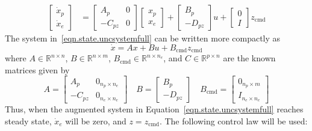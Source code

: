 \begin{equation}
  \label{eqn.state.uncsystemfull}
  \begin{split}
    \begin{bmatrix}
      \dot{x}_{p} \\
      \dot{x}_{e}
    \end{bmatrix}
    &=
    \begin{bmatrix}
      A_{p} & 0 \\
      -C_{pz} & 0
    \end{bmatrix}
    \begin{bmatrix}
      x_{p} \\
      x_{e}
    \end{bmatrix}
    +
    \begin{bmatrix}
      B_{p} \\
      -D_{pz}
    \end{bmatrix} u
    +
    \begin{bmatrix}
      0 \\
      I
    \end{bmatrix}z_{\text{cmd}}
  \end{split}
\end{equation}
The system in~\eqref{eqn.state.uncsystemfull} can be written more compactly as
\begin{equation}
  \label{eqn.state.uncsystem}
  \dot{x}=Ax+Bu+B_{\text{cmd}}z_{\text{cmd}}
\end{equation}
where $A\in\mathbb{R}^{n\times n}$, $B\in\mathbb{R}^{n\times m}$, $B_{\text{cmd}}\in\mathbb{R}^{n\times n_{e}}$, and $C\in\mathbb{R}^{p\times n}$ are the known matrices given by
\begin{equation*}
  A=
  \begin{bmatrix}
    A_{p} & 0_{n_{p}\times n_{e}} \\
    -C_{pz} & 0_{n_{e}\times n_{e}}
  \end{bmatrix} \quad
  B=
  \begin{bmatrix}
    B_{p} \\
    -D_{pz}
  \end{bmatrix}
  \quad
  B_{\text{cmd}}=
  \begin{bmatrix}
    0_{n_{p}\times m} \\
    I_{n_{e}\times n_{e}}
  \end{bmatrix}
\end{equation*}
Thus, when the augmented system in Equation~\eqref{eqn.state.uncsystemfull} reaches steady state, $\dot{x}_{e}$ will be zero, and $z=z_{\text{cmd}}$.
The following control law will be used:
